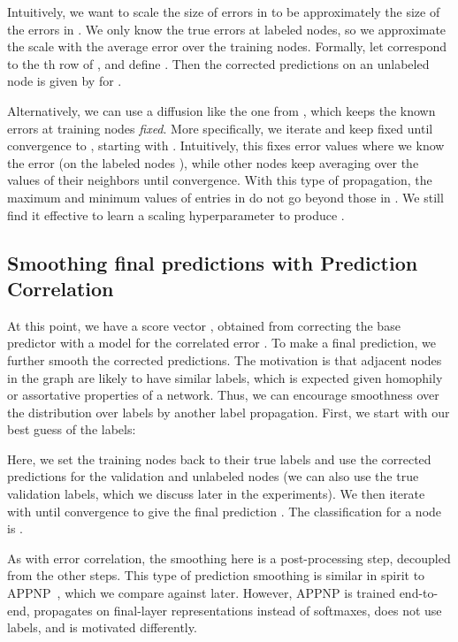 \documentclass{article}
\newcommand{\xhdr}[1]{\vspace{0.0mm}\noindent{\textbf{#1.}}\hspace{0.5mm}}
\begin{document}
\xhdr{Autoscale} Intuitively, we want to scale the size of errors in  to be approximately the size of the errors in .
We only know the true errors at labeled nodes, so we approximate the scale with the average error over the training nodes.
Formally, let  correspond to the th row of , and define
. Then the corrected predictions on
an unlabeled node  is given by
 for .

\xhdr{Scaled Fixed Diffusion (FDiff-scale)}
Alternatively, we can use a diffusion like the one from \citet{Zhu2003SemiSupervisedLU},
which keeps the known errors at training nodes \emph{fixed}.
More specifically, we iterate  and keep fixed  until convergence to , starting with .
Intuitively, this fixes error values where we know the error (on the labeled nodes ), while other nodes keep averaging over the values of their neighbors until convergence.
With this type of propagation, the maximum and minimum values of entries in  do not go beyond those in . 
We still find it effective to learn a scaling hyperparameter  to produce . 

\subsection{Smoothing final predictions with Prediction Correlation}
At this point, we have a score vector , obtained from correcting the base predictor 
with a model for the correlated error .
To make a final prediction, we further smooth the corrected predictions. 
The motivation is that adjacent nodes in the graph are likely to have similar labels,
which is expected given homophily or assortative properties of a network.
Thus, we can encourage smoothness over the distribution over labels by another label propagation.
First, we start with our best guess  of the labels:

Here, we set the training nodes back to their true labels and use the corrected predictions for the validation and unlabeled nodes
(we can also use the true validation labels, which we discuss later in the experiments).
We then iterate  with  until convergence to give the final prediction .
The classification for a node  is .

As with error correlation, the smoothing here is a post-processing step, decoupled from the other steps.
This type of prediction smoothing is similar in spirit to APPNP~\citep{klicpera2018predict}, which we compare against later.
However, APPNP is trained end-to-end, propagates on final-layer representations instead of softmaxes, does not use labels, and is motivated differently.
\end{document}
